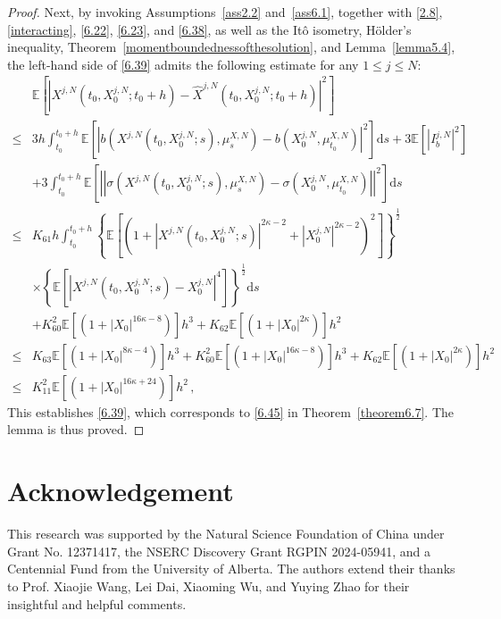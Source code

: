\documentclass[12pt]{article}
\numberwithin{equation}{section}
\begin{document}
\begin{proof}
Next, by invoking Assumptions~\ref{ass2.2} and~\ref{ass6.1}, together with  \eqref{2.8}, \eqref{interacting}, \eqref{6.22}, \eqref{6.23}, and \eqref{6.38}, as well as the It\^o isometry, H\"older's inequality, Theorem~\ref{momentboundednessofthesolution}, and Lemma~\ref{lemma5.4}, the left-hand side of \eqref{6.39} admits the following estimate for any $1 \leq j \leq N$:
\begin{equation}\tag{5.138}\label{6.41}
\begin{aligned} 
	&\mathbb{E} \left[ \left|X^{j,N}\left( t_0,X^{j,N}_0;t_0+h \right) -\hat{X}^{j,N}\left( t_0,X^{j,N}_0;t_0+h \right)\right |^2 \right]\\
	\le& 3h\int_{t_0}^{t_0+h}{\mathbb{E} \left[ \left| b\left( X^{j,N}\left( t_0,X^{j,N}_0;s \right) ,\mu _{s}^{X,N} \right) -b\left( X^{j,N}_0,\mu _{t_0}^{X,N} \right) \right|^2 \right]}\mathrm{d}s+3\mathbb{E} \left[ \left| I_{b}^{j,N} \right|^2 \right]\\
	&+3\int_{t_0}^{t_0+h}{\mathbb{E}}\left[ \left|\left| \sigma \left( X^{j,N}\left( t_0,X^{j,N}_0;s \right) ,\mu _{s}^{X,N} \right) -\sigma \left( X^{j,N}_0,\mu _{t_0}^{X,N} \right) \right|\right| ^2 \right] \mathrm{d}s\\
\le& K_{61}h\int_{t_0}^{t_0+h}{\left\{ \mathbb{E} \left[ \left( 1+\left|X^{j,N}\left( t_0,X^{j,N}_0;s \right) \right|^{2\kappa -2}+\left|X^{j,N}_0\right|^{2\kappa -2} \right) ^{2} \right] \right\} ^{\frac{1}{2}}}\\
&\times \left\{ \mathbb{E} \left[ \left|X^{j,N}\left( t_0,X^{j,N}_0;s \right) -X^{j,N}_0\right|^{4} \right] \right\} ^{\frac{1}{2}}\mathrm{d}s\\
&+K^{2}_{60}\mathbb{E} \left[ \left(1+\left|X_0\right|^{16\kappa -8}\right) \right] h^3+K_{62}\mathbb{E} \left[ \left(1+\left|X_0\right|^{2\kappa}\right) \right] h^2\\
\le& K_{63}\mathbb{E} \left[ \left(1+\left|X_0\right|^{8\kappa -4} \right)\right] h^3+K^{2}_{60}\mathbb{E} \left[ \left(1+\left|X_0\right|^{16\kappa -8}\right) \right] h^3+K_{62}\mathbb{E} \left[ \left(1+\left|X_0\right|^{2\kappa}\right) \right] h^2\\
\le& K^{2}_{11}\mathbb{E} \left[ \left(1+\left|X_0\right|^{16\kappa +24}\right) \right] h^2\,,
\end{aligned}
\end{equation}
This establishes \eqref{6.39}, which corresponds to \eqref{6.45} in Theorem~\ref{theorem6.7}.
The lemma is thus proved.
\end{proof}   

\section*{\textbf{Acknowledgement}}
This research was supported by the Natural Science Foundation of China under Grant No. 12371417, the NSERC Discovery Grant RGPIN 2024-05941, and a Centennial Fund from the University of Alberta. 
The authors  extend their thanks to Prof. Xiaojie Wang, Lei Dai, Xiaoming Wu, and Yuying Zhao for their insightful and helpful comments.
{\color{black} 
}

%

%
%

\end{document}
